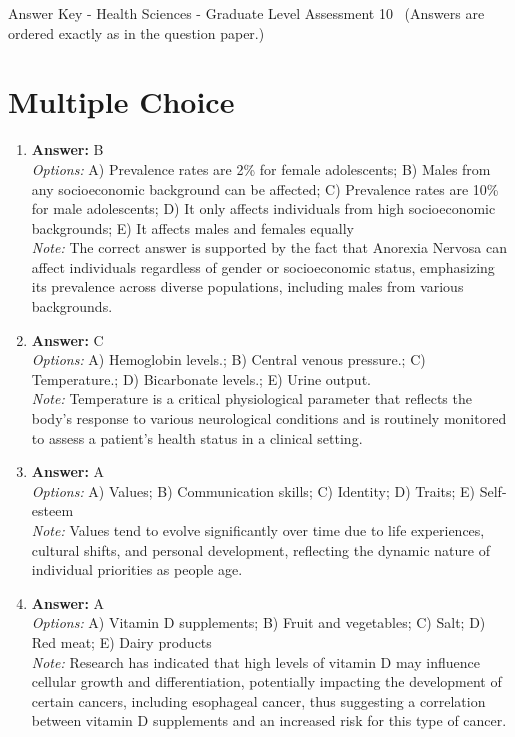 \documentclass[12pt]{article}
\begin{document}
\begin{center}
Answer Key - Health Sciences - Graduate Level Assessment 10 \
\small (Answers are ordered exactly as in the question paper.)
\end{center}

\section*{Multiple Choice}
\begin{enumerate}[label=\arabic*.]
\item \textbf{Answer:} B
\\ \textit{Options:} A) Prevalence rates are 2\% for female adolescents; B) Males from any socioeconomic background can be affected; C) Prevalence rates are 10\% for male adolescents; D) It only affects individuals from high socioeconomic backgrounds; E) It affects males and females equally
\\ \textit{Note:} The correct answer is supported by the fact that Anorexia Nervosa can affect individuals regardless of gender or socioeconomic status, emphasizing its prevalence across diverse populations, including males from various backgrounds.
\item \textbf{Answer:} C
\\ \textit{Options:} A) Hemoglobin levels.; B) Central venous pressure.; C) Temperature.; D) Bicarbonate levels.; E) Urine output.
\\ \textit{Note:} Temperature is a critical physiological parameter that reflects the body's response to various neurological conditions and is routinely monitored to assess a patient's health status in a clinical setting.
\item \textbf{Answer:} A
\\ \textit{Options:} A) Values; B) Communication skills; C) Identity; D) Traits; E) Self-esteem
\\ \textit{Note:} Values tend to evolve significantly over time due to life experiences, cultural shifts, and personal development, reflecting the dynamic nature of individual priorities as people age.
\item \textbf{Answer:} A
\\ \textit{Options:} A) Vitamin D supplements; B) Fruit and vegetables; C) Salt; D) Red meat; E) Dairy products
\\ \textit{Note:} Research has indicated that high levels of vitamin D may influence cellular growth and differentiation, potentially impacting the development of certain cancers, including esophageal cancer, thus suggesting a correlation between vitamin D supplements and an increased risk for this type of cancer.

\end{enumerate}
\end{document}
